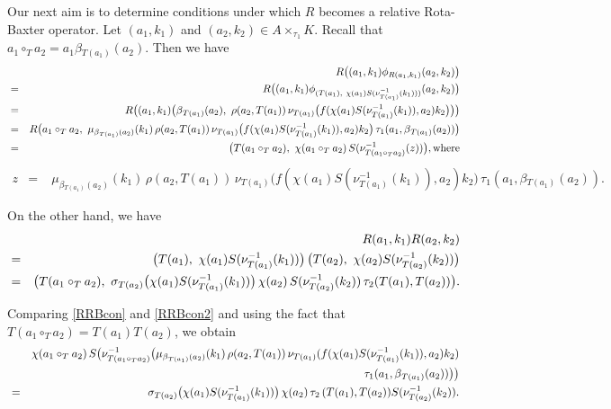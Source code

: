 \documentclass[11pt]{amsart}
\theoremstyle{thrm}
\theoremstyle{plain}
\theoremstyle{definition}
\numberwithin{equation}{section}
\begin{document}
Our next aim is to determine conditions  under which $R$ becomes a relative Rota-Baxter operator. Let $(a_1,k_1)$ and $(a_2, k_2) \in A \times_{\tau_1} K$. Recall that $a_1 \circ_{T} a_2=a_1 \beta{}_{T(a_1)}(a_2)$. Then we have
\begin{eqnarray}\label{RRBcon}
	&& R\big( (a_1,k_1) \phi_{R(a_1,k_1)} (a_2, k_2) \big)\\
	&=& R \big( (a_1, k_1) \phi_{(T(a_1), ~\chi(a_1) S(\nu^{-1}_{T(a_1)}(k_1)))}(a_2, k_2) \big)\notag\\
	&=& R \big( (a_1, k_1) \big(\beta{_{T(a_1)}}(a_2), ~\rho(a_2, T(a_1)) \,\nu_{T(a_1)} \big(f(\chi(a_1) S(\nu^{-1}_{T(a_1)}(k_1)), a_2)  k_2 \big) \big)\big)\notag\\
	&=& R \big( a_1 \circ_{T} a_2,~ \mu_{\beta{_{T(a_1)}(a_2)}}(k_1) \, \rho(a_2, T(a_1)) \,\nu_{T(a_1)} \big(f(\chi(a_1) S(\nu^{-1}_{T(a_1)}(k_1)), a_2)k_2 \big) \,\tau_1(a_1, \beta{_{T(a_1)}(a_2)}) \big)\notag\\
	&=& \big(T(a_1 \circ_{T} a_2), ~\chi(a_1 \circ_{T}  a_2) \,S(\nu^{-1}_{T(a_1 \circ_{T} a_2)} (z)) \big), \text{where} \notag
\end{eqnarray}
\begin{eqnarray*}
	z&=&\; \mu_{\beta{_{T(a_1)}(a_2)}}(k_1)\, \rho(a_2, T(a_1)) \,\nu_{T(a_1)} \big(f(\chi(a_1) S(\nu^{-1}_{T(a_1)}(k_1)), a_2) k_2 \big)  \, \tau_1(a_1,\beta{_{T(a_1)}(a_2)}).
\end{eqnarray*}

On the other hand, we have
\begin{eqnarray}\label{RRBcon2}
&& R (a_1,k_1)R (a_2,k_2)\\
&= & \big(T(a_1),~ \chi(a_1) S(\nu^{-1}_{T(a_1)}(k_1)) \big)\, \big(T(a_2), ~\chi(a_2) S(\nu^{-1}_{T(a_2)}(k_2))\big)\notag\\
&=& \big(T(a_1 \circ_{T} a_2),~ \sigma_{T(a_2)}\big( \chi(a_1) S(\nu^{-1}_{T(a_1)}(k_1))\big) \, \chi(a_2) \,S(\nu^{-1}_{T(a_2)}(k_2)) \,\tau_2(T(a_1), T(a_2) ) \big) \notag.
\end{eqnarray} 

Comparing \eqref{RRBcon} and \eqref{RRBcon2} and using the fact that $T(a_1 \circ_{T} a_2)=  T(a_1)T(a_2)$, we obtain
\begin{eqnarray}\label{Rmain}
	&& \chi(a_1 \circ_{T} a_2) \,S\big( \nu^{-1}_{T(a_1 \circ_{T} a_2)} \big(\mu_{\beta{_{T(a_1)}}(a_2)}(k_1) \, \rho(a_2, T(a_1))\, \nu_{T(a_1)}(f(\chi(a_1) S(\nu^{-1}_{T(a_1)}(k_1)), a_2)k_2) \\
	&&  \tau_1(a_1,\beta{_{T(a_1)}}(a_2))\big) \big)\notag\\
	&=& \sigma_{T(a_2)}\big( \chi(a_1) S(\nu^{-1}_{T(a_1)}(k_1))\big)\, \chi(a_2)\, \tau_2 \,(T(a_1), T(a_2) )S(\nu^{-1}_{T(a_2)}(k_2)) . \notag
\end{eqnarray}
\end{document}
